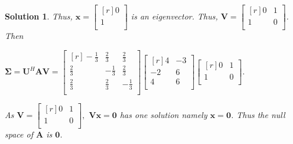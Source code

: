 \documentclass{article}
\newtheorem*{solution}{Solution}
\begin{document}
\begin{solution}
    Thus, $\mathbf{x} =                 
    \begin{bmatrix*}[r]
        0 \\
        1 \\
    \end{bmatrix*}$ is an eigenvector. Thus, $\mathbf{V} =     
    \begin{bmatrix*}[r]
        0 & 1 \\
        1 & 0 \\
    \end{bmatrix*}$.
    Then
    \begin{center}
        \begin{math}
            \mathbf{\Sigma} = \mathbf{U}^{H}\mathbf{A}\mathbf{V} = 
                \begin{bmatrix*}[r]
                    -\frac{1}{3} & \frac{2}{3} & \frac{2}{3} \\
                    \frac{2}{3} & -\frac{1}{3} & \frac{2}{3} \\
                    \frac{2}{3} & \frac{2}{3} & -\frac{1}{3} \\
                \end{bmatrix*}
                \begin{bmatrix*}[r]
                    4 & -3 \\
                    -2 & 6 \\
                    4 & 6 \\ 
                \end{bmatrix*}
                \begin{bmatrix*}[r]
                    0 & 1 \\
                    1 & 0 \\
                \end{bmatrix*}.
        \end{math}
    \end{center}

    As 
    \begin{math}
        \mathbf{V} =
            \begin{bmatrix*}[r]
                0 & 1 \\
                1 & 0 \\
            \end{bmatrix*},
    \end{math}
    $\mathbf{V}\mathbf{x} = \mathbf{0}$ has one solution namely $\mathbf{x} = \mathbf{0}$.
    Thus the null space of $\mathbf{A}$ is $\mathbf{0}$.
\end{solution}
\end{document}
